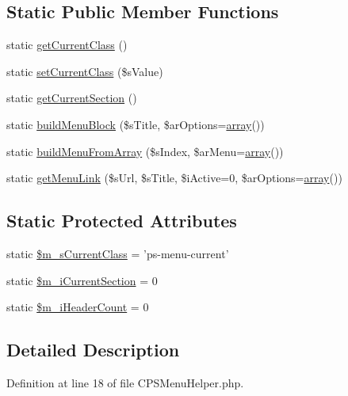 \subsection*{Static Public Member Functions}
\begin{DoxyCompactItemize}
\item 
static \hyperlink{classCPSMenuHelper_a69f1b41a2a95fcc3f76e96e13fcd6985}{getCurrentClass} ()
\item 
static \hyperlink{classCPSMenuHelper_a3c73b74ee982e9676097fbd2e42208e1}{setCurrentClass} (\$sValue)
\item 
static \hyperlink{classCPSMenuHelper_ad6035e20b3d67fe710a0db2c3d10019e}{getCurrentSection} ()
\item 
static \hyperlink{classCPSMenuHelper_a1423d1c85867a2f1f6dbf77a0c051b41}{buildMenuBlock} (\$sTitle, \$arOptions=\hyperlink{list_8php_aa3205d038c7f8feb5c9f01ac4dfadc88}{array}())
\item 
static \hyperlink{classCPSMenuHelper_a5c720cd125d4437d4ed589278a75046c}{buildMenuFromArray} (\$sIndex, \$arMenu=\hyperlink{list_8php_aa3205d038c7f8feb5c9f01ac4dfadc88}{array}())
\item 
static \hyperlink{classCPSMenuHelper_a93c7eb2cf15e5371d6671031a60629e8}{getMenuLink} (\$sUrl, \$sTitle, \$iActive=0, \$arOptions=\hyperlink{list_8php_aa3205d038c7f8feb5c9f01ac4dfadc88}{array}())
\end{DoxyCompactItemize}
\subsection*{Static Protected Attributes}
\begin{DoxyCompactItemize}
\item 
static \hyperlink{classCPSMenuHelper_acc409b01c46f516da036994427bb80a2}{\$m\_\-sCurrentClass} = 'ps-\/menu-\/current'
\item 
static \hyperlink{classCPSMenuHelper_ab6bcd8d2a1b21bcdeeb554a76305637e}{\$m\_\-iCurrentSection} = 0
\item 
static \hyperlink{classCPSMenuHelper_ae2b5f115567bf9c7d2603846b88cff51}{\$m\_\-iHeaderCount} = 0
\end{DoxyCompactItemize}


\subsection{Detailed Description}


Definition at line 18 of file CPSMenuHelper.php.



